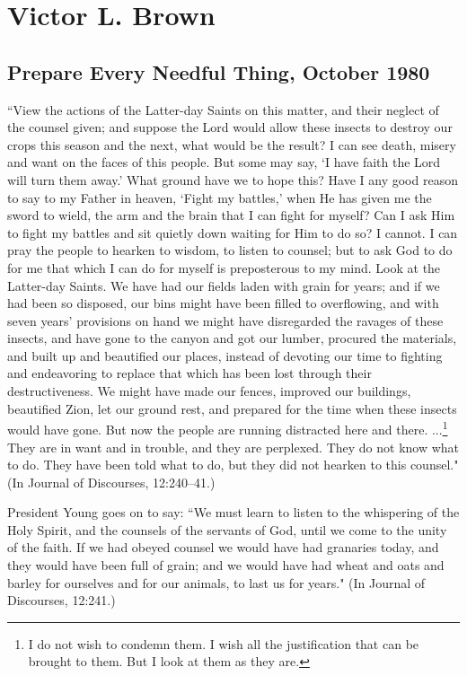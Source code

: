 \section{Victor L. Brown}

\subsection{Prepare Every Needful Thing, October 1980}

``View the actions of the Latter-day Saints on this matter, and their neglect of the counsel given; and suppose the Lord would allow these insects to destroy our crops this season and the next, what would be the result? I can see death, misery and want on the faces of this people. But some may say, `I have faith the Lord will turn them away.' What ground have we to hope this? Have I any good reason to say to my Father in heaven, `Fight my battles,' when He has given me the sword to wield, the arm and the brain that I can fight for myself? Can I ask Him to fight my battles and sit quietly down waiting for Him to do so? I cannot. I can pray the people to hearken to wisdom, to listen to counsel; but to ask God to do for me that which I can do for myself is preposterous to my mind. Look at the Latter-day Saints. We have had our fields laden with grain for years; and if we had been so disposed, our bins might have been filled to overflowing, and with seven years' provisions on hand we might have disregarded the ravages of these insects, and have gone to the canyon and got our lumber, procured the materials, and built up and beautified our places, instead of devoting our time to fighting and endeavoring to replace that which has been lost through their destructiveness. We might have made our fences, improved our buildings, beautified Zion, let our ground rest, and prepared for the time when these insects would have gone. But now the people are running distracted here and there. ...\footnote{I do not wish to condemn them. I wish all the justification that can be brought to them. But I look at them as they are.} They are in want and in trouble, and they are perplexed. They do not know what to do. They have been told what to do, but they did not hearken to this counsel." (In Journal of Discourses, 12:240–41.)

President Young goes on to say: ``We must learn to listen to the whispering of the Holy Spirit, and the counsels of the servants of God, until we come to the unity of the faith. If we had obeyed counsel we would have had granaries today, and they would have been full of grain; and we would have had wheat and oats and barley for ourselves and for our animals, to last us for years." (In Journal of Discourses, 12:241.)

